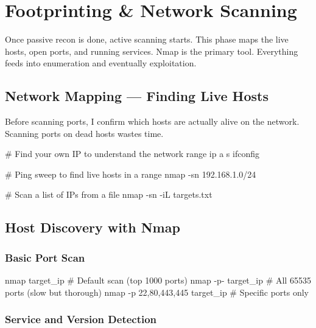 \chapter{Footprinting \& Network Scanning}
\label{ch:footprinting}

Once passive recon is done, active scanning starts. This phase maps the live
hosts, open ports, and running services. Nmap is the primary tool. Everything
feeds into enumeration and eventually exploitation.

\section{Network Mapping --- Finding Live Hosts}
\label{sec:network_mapping}

Before scanning ports, I confirm which hosts are actually alive on the network.
Scanning ports on dead hosts wastes time.

\begin{termbox}
# Find your own IP to understand the network range
ip a s
ifconfig

# Ping sweep to find live hosts in a range
nmap -sn 192.168.1.0/24

# Scan a list of IPs from a file
nmap -sn -iL targets.txt
\end{termbox}


\section{Host Discovery with Nmap}
\label{sec:host_discovery}

\subsection{Basic Port Scan}

\begin{termbox}
nmap target_ip                    # Default scan (top 1000 ports)
nmap -p- target_ip                # All 65535 ports (slow but thorough)
nmap -p 22,80,443,445 target_ip   # Specific ports only
\end{termbox}

\subsection{Service and Version Detection}

